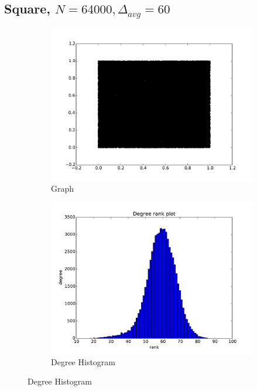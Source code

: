 \documentclass[oneside, titlepage]{scrartcl}
\begin{document}
\subsection{Square, $N=64000, \Delta_{avg}=60$}
\begin{figure}[!h]
\centering
\begin{subfigure}{0.5\textwidth}
	\centering
	\includegraphics[width=0.9\linewidth]{figures/graph5.pdf}
	\caption{Graph}
\end{subfigure}%
\begin{subfigure}{0.5\textwidth}
	\centering
	\includegraphics[width=0.9\linewidth]{figures/degrees5.pdf}
	\caption{Degree Histogram}
\end{subfigure}


\end{figure}
\end{document}
